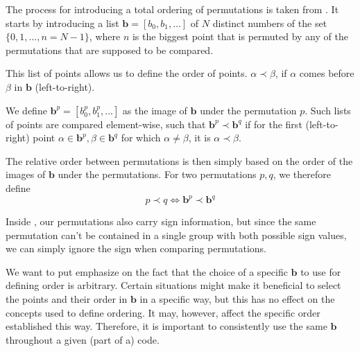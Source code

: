 \documentclass[parskip=half]{scrartcl}
\begin{document}
	The process for introducing a total ordering of permutations is taken from \textcite{Manssur2002a}. It starts by introducing a list $\mathbf{b} =
	[b_0, b_1, \ldots]$ of $N$ distinct numbers of the set $\{ 0, 1, \ldots, n = N - 1 \}$, where $n$ is the biggest point that is permuted by any of
	the permutations that are supposed to be compared.

	This list of points allows us to define the order of points. $\alpha \prec \beta$, if $\alpha$ comes before $\beta$ in $\mathbf{b}$
	(left-to-right).\supercite{Manssur2002a}

	We define $\mathbf{b}^p = [ b_0^p, b_1^p, \ldots ]$ as the image of $\mathbf{b}$ under the permutation $p$. Such lists of points are compared
	element-wise, such that $\mathbf{b}^p \prec \mathbf{b}^q$ if for the first (left-to-right) point $\alpha \in \mathbf{b}^p, \beta \in \mathbf{b}^q$
	for which $\alpha \neq \beta$, it is $\alpha \prec \beta$.\supercite{Manssur2002a}

	The relative order between permutations is then simply based on the order of the images of $\mathbf{b}$ under the permutations. For two
	permutations $p,q$, we therefore define\supercite{Manssur2002a}
	\begin{equation}
		p \prec q \iff \mathbf{b}^p \prec \mathbf{b}^q
	\end{equation}

	Inside , our permutations also carry sign information, but since the same permutation can't be contained in a single group with both
	possible sign values\supercite{Manssur2002a}, we can simply ignore the sign when comparing permutations.\supercite{Manssur2002a}

	We want to put emphasize on the fact that the choice of a specific $\mathbf{b}$ to use for defining order is arbitrary. Certain situations might
	make it beneficial to select the points and their order in $\mathbf{b}$ in a specific way, but this has no effect on the concepts used to define
	ordering. It may, however, affect the specific order established this way. Therefore, it is important to consistently use the same $\mathbf{b}$
	throughout a given (part of a) code.


	\cleardoublepage
	\printbibliography
\end{document}

